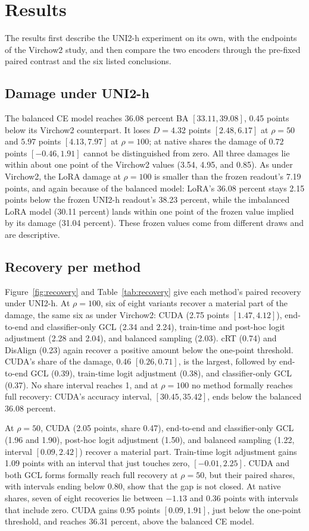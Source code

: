 \section{Results}
\label{sec:results}
The results first describe the UNI2-h experiment on its own, with the endpoints of the Virchow2 study, and then compare the two encoders through the pre-fixed paired contrast and the six listed conclusions.

\subsection{Damage under UNI2-h}
The balanced CE model reaches 36.08 percent BA $[33.11, 39.08]$, 0.45 points below its Virchow2 counterpart. It loses $D=4.32$ points $[2.48, 6.17]$ at $\rho=50$ and $5.97$ points $[4.13, 7.97]$ at $\rho=100$; at native shares the damage of $0.72$ points $[-0.46, 1.91]$ cannot be distinguished from zero. All three damages lie within about one point of the Virchow2 values (3.54, 4.95, and 0.85). As under Virchow2, the LoRA damage at $\rho=100$ is smaller than the frozen readout's 7.19 points, and again because of the balanced model: LoRA's 36.08 percent stays 2.15 points below the frozen UNI2-h readout's 38.23 percent, while the imbalanced LoRA model (30.11 percent) lands within one point of the frozen value implied by its damage (31.04 percent). These frozen values come from different draws and are descriptive.

\subsection{Recovery per method}
Figure~\ref{fig:recovery} and Table~\ref{tab:recovery} give each method's paired recovery under UNI2-h. At $\rho=100$, six of eight variants recover a material part of the damage, the same six as under Virchow2: CUDA (2.75 points $[1.47, 4.12]$), end-to-end and classifier-only GCL (2.34 and 2.24), train-time and post-hoc logit adjustment (2.28 and 2.04), and balanced sampling (2.03). cRT (0.74) and DisAlign (0.23) again recover a positive amount below the one-point threshold. CUDA's share of the damage, 0.46 $[0.26, 0.71]$, is the largest, followed by end-to-end GCL (0.39), train-time logit adjustment (0.38), and classifier-only GCL (0.37). No share interval reaches 1, and at $\rho=100$ no method formally reaches full recovery: CUDA's accuracy interval, $[30.45, 35.42]$, ends below the balanced 36.08 percent.

At $\rho=50$, CUDA (2.05 points, share 0.47), end-to-end and classifier-only GCL (1.96 and 1.90), post-hoc logit adjustment (1.50), and balanced sampling (1.22, interval $[0.09, 2.42]$) recover a material part. Train-time logit adjustment gains 1.09 points with an interval that just touches zero, $[-0.01, 2.25]$. CUDA and both GCL forms formally reach full recovery at $\rho=50$, but their paired shares, with intervals ending below 0.80, show that the gap is not closed. At native shares, seven of eight recoveries lie between $-1.13$ and $0.36$ points with intervals that include zero. CUDA gains 0.95 points $[0.09, 1.91]$, just below the one-point threshold, and reaches 36.31 percent, above the balanced CE model.

